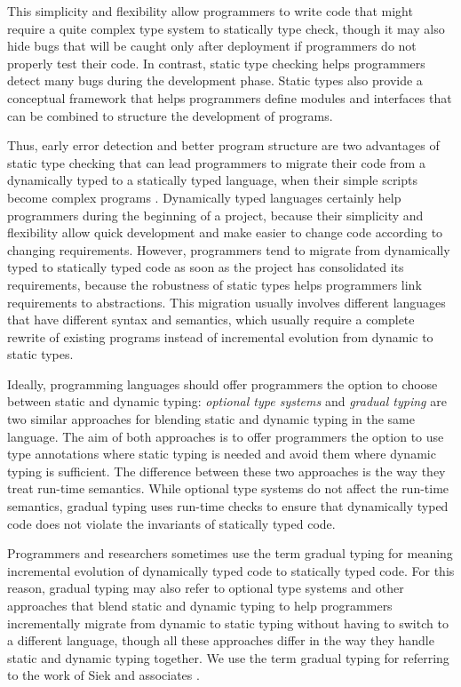 \documentclass[preprint]{sig-alternate}
\begin{document}
This simplicity and flexibility allow programmers to write code that
might require a quite complex type system to statically type check,
though it may also hide bugs that will be caught only after deployment
if programmers do not properly test their code.
In contrast, static type checking helps programmers detect many 
bugs during the development phase.
Static types also provide a conceptual framework that helps
programmers define modules and interfaces that can be combined to
structure the development of programs.

Thus, early error detection and better program structure are two
advantages of static type checking that can lead programmers to
migrate their code from a dynamically typed to a statically
typed language, when their simple scripts become complex programs
\cite{tobin-hochstadt2006ims}.
Dynamically typed languages certainly help programmers during the
beginning of a project, because their simplicity and flexibility
allow quick development and make easier to change code according to
changing requirements.
However, programmers tend to migrate from dynamically typed to
statically typed code as soon as the project has consolidated its
requirements, because the robustness of static types helps
programmers link requirements to abstractions.
This migration usually involves different languages that have
different syntax and semantics, which usually require a complete
rewrite of existing programs instead of incremental evolution from
dynamic to static types.

Ideally, programming languages should offer programmers the
option to choose between static and dynamic typing:
\textit{optional type systems} \cite{bracha2004pluggable} and
\textit{gradual typing} \cite{siek2006gradual} are two similar
approaches for blending static and dynamic typing in the same
language.
The aim of both approaches is to offer programmers the option
to use type annotations where static typing is needed and avoid them
where dynamic typing is sufficient.
The difference between these two approaches is the way they treat
run-time semantics.
While optional type systems do not affect the run-time semantics,
gradual typing uses run-time checks to ensure that dynamically typed
code does not violate the invariants of statically typed code.

Programmers and researchers sometimes use the term gradual typing for
meaning incremental evolution of dynamically typed code to statically
typed code.
For this reason, gradual typing may also refer to optional type
systems and other approaches that blend static and dynamic typing to
help programmers incrementally migrate from dynamic to static typing
without having to switch to a different language, though all these
approaches differ in the way they handle static and dynamic typing
together.
We use the term gradual typing for referring to the work of Siek and
associates \cite{siek2006gradual}.
\end{document}

